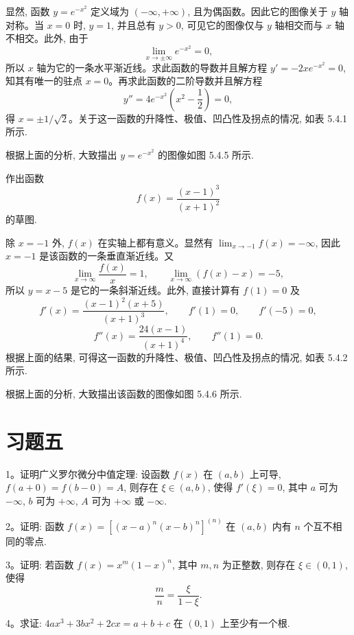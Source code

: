 \begin{solve}
显然, 函数 $y=e^{-x^2}$ 定义域为 $(-\infty,+\infty)$, 且为偶函数。因此它的图像关于 $y$ 轴对称。当 $x=0$ 时, $y=1$, 并且总有 $y>0$, 可见它的图像仅与 $y$ 轴相交而与 $x$ 轴不相交。此外, 由于
\[
  \lim_{x\to\pm\infty}e^{-x^2}=0,
\]
所以 $x$ 轴为它的一条水平渐近线。求此函数的导数并且解方程 $y'=-2xe^{-x^2}=0$, 知其有唯一的驻点 $x=0$。再求此函数的二阶导数并且解方程
\[
  y''=4e^{-x^2}\left(x^2-\frac12\right)=0,
\]
得 $x=\pm1/\sqrt2$。关于这一函数的升降性、极值、凹凸性及拐点的情况, 如表 5.4.1 所示.

根据上面的分析, 大致描出 $y=e^{-x^2}$ 的图像如图 5.4.5 所示.
\end{solve}


\begin{example}\label{example:ma-5-4-13}
作出函数
\[
  f(x)=\frac{(x-1)^3}{(x+1)^2}
\]
的草图.
\end{example}


\begin{solve}
除 $x=-1$ 外, $f(x)$ 在实轴上都有意义。显然有 $\lim_{x\to-1}f(x)=-\infty$, 因此 $x=-1$ 是该函数的一条垂直渐近线。又
\[
  \lim_{x\to\infty}\frac{f(x)}x=1,\qquad
  \lim_{x\to\infty}(f(x)-x)=-5,
\]
所以 $y=x-5$ 是它的一条斜渐近线。此外, 直接计算有 $f(1)=0$ 及
\[
  f'(x)=\frac{(x-1)^2(x+5)}{(x+1)^3},\qquad
  f'(1)=0,\qquad f'(-5)=0,
\]
\[
  f''(x)=\frac{24(x-1)}{(x+1)^4},\qquad f''(1)=0.
\]
根据上面的结果, 可得这一函数的升降性、极值、凹凸性及拐点的情况, 如表 5.4.2 所示.

根据上面的分析, 大致描出该函数的图像如图 5.4.6 所示.
\end{solve}


\section*{习题五}
{}
\label{exercises:ma-5}

1。证明广义罗尔微分中值定理: 设函数 $f(x)$ 在 $(a,b)$ 上可导, $f(a+0)=f(b-0)=A$, 则存在 $\xi\in(a,b)$, 使得 $f'(\xi)=0$, 其中 $a$ 可为 $-\infty$, $b$ 可为 $+\infty$, $A$ 可为 $+\infty$ 或 $-\infty$.

2。证明: 函数 $f(x)=[(x-a)^n(x-b)^n]^{(n)}$ 在 $(a,b)$ 内有 $n$ 个互不相同的零点.

3。证明: 若函数 $f(x)=x^m(1-x)^n$, 其中 $m,n$ 为正整数, 则存在 $\xi\in(0,1)$, 使得
\[
  \frac mn=\frac{\xi}{1-\xi}.
\]

4。求证: $4ax^3+3bx^2+2cx=a+b+c$ 在 $(0,1)$ 上至少有一个根.

